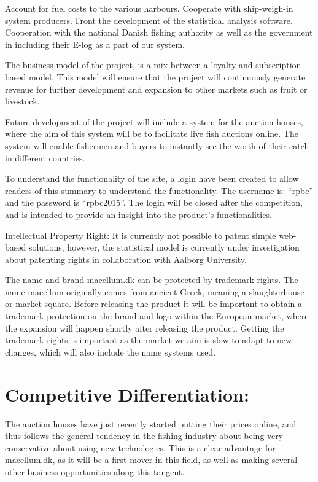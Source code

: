 \documentclass[12pt]{article}
\begin{document}
Account for fuel costs to the various harbours.
Cooperate with ship-weigh-in system producers.
Front the development of the statistical analysis software.
Cooperation with the national Danish fishing authority as well as the government in including their E-log as a part of our system.

The business model of the project, is a mix between a loyalty and subscription based model. This model will ensure that the project will continuously generate revenue for further development and expansion to other markets such as fruit or livestock.

Future development of the project will include a system for the auction houses, where the aim of this system will be to facilitate live fish auctions online. The system will enable fishermen and buyers to instantly see the worth of their catch in different countries.

To understand the functionality of the site, a login have been created to allow readers of this summary to understand the functionality. The username is: “rpbc” and the password is “rpbc2015”. The login will be closed after the competition, and is intended to provide an insight into the product’s functionalities.

Intellectual Property Right:
It is currently not possible to patent simple web-based solutions, however, the statistical model is currently under investigation about patenting rights in collaboration with Aalborg University. 

The name and brand macellum.dk can be protected by trademark rights. The name macellum originally comes from ancient Greek, meaning a slaughterhouse or market square.
Before releasing the product it will be important to obtain a trademark protection on the brand and logo within the European market, where the expansion will happen shortly after releasing the product.
Getting the trademark rights is important as the market we aim is slow to adapt to new changes, which will also include the name systems used.

\section{Competitive Differentiation:}
The auction houses have just recently started putting their prices online, and thus follows the general tendency in the fishing industry about being very conservative about using new technologies. This is a clear advantage for macellum.dk, as it will be a first mover in this field, as well as making several other business opportunities along this tangent. 
\end{document}
